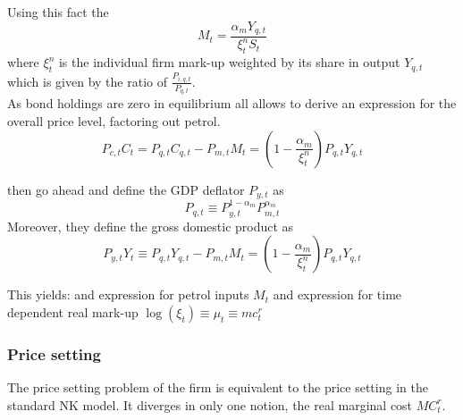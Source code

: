 \documentclass[12pt,a4paper,english]{article} %
\begin{document}
	Using this fact the 
	\begin{equation}
		M_t = \frac{\alpha_m Y_{q,t}}{\xi_{t}^n S_t}
	\end{equation}
	where $\xi_t^n$ is the individual firm mark-up weighted by its share in output $Y_{q,t}$ which is given by the ratio of $\frac{P_{i,q,t}}{P_{q,t}}$. \\
	
	As bond holdings are zero in equilibrium all  allows to derive an expression for the overall price level, factoring out petrol.
	\begin{equation}
		P_{c,t}C_t = P_{q,t} C_{q,t} - P_{m,t}M_t = \left(1 - \frac{\alpha_m}{\xi_t^n} \right) P_{q,t} Y_{q,t}
	\end{equation}

	\cite{blanchard_macroeconomic_2007} then go ahead and define the GDP deflator $P_{y,t}$ as
	\begin{equation}
		P_{q,t} \equiv P_{y,t}^{1-\alpha_m} P_{m,t}^{\alpha_m}
	\end{equation}
	Moreover, they define the gross domestic product as 
	\begin{equation}
		P_{y,t} Y_t \equiv P_{q,t} Y_{q,t} - P_{m,t} M_t = \left( 1 - \frac{\alpha_m}{\xi_t^n} \right) P_{q,t} Y_{q,t}
	\end{equation}
	
	This yields:
	and expression for petrol inputs $M_t$
	and expression for time dependent real mark-up $\log(\xi_t) \equiv \mu_t \equiv mc_t^r$
	
	
	\subsubsection{Price setting}
	The price setting problem of the firm is equivalent to the price setting in the standard NK model. It diverges in only one notion, the real marginal cost $MC_t^r$. \\
	
\end{document}
